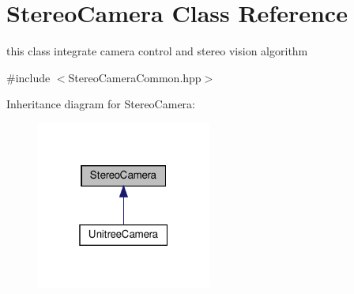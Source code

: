 \hypertarget{class_stereo_camera}{}\section{Stereo\+Camera Class Reference}
\label{class_stereo_camera}


this class integrate camera control and stereo vision algorithm  




{\ttfamily \#include $<$Stereo\+Camera\+Common.\+hpp$>$}



Inheritance diagram for Stereo\+Camera\+:
\nopagebreak
\begin{figure}[H]
\begin{center}
\leavevmode
\includegraphics[width=163pt]{class_stereo_camera__inherit__graph}
\end{center}
\end{figure}
